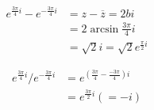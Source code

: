 \documentclass[11pt, a4paper, norsk]{NTNUoving}
\begin{document}
\begin{oppgave}
    \begin{punkt}
        \begin{align*}
            e^{\frac{3\pi}{4}i} - e^{-\frac{3\pi}{4}i} &=
            z-\overline{z} = 2bi
            \\&= 2\arcsin{\frac{3\pi}{4}}i
            \\&= \sqrt{2}i = \sqrt{2} e^{\frac{\pi}{2}i}
        \end{align*}
    \end{punkt}
    
    \begin{punkt}
        \begin{align*}
            e^{\frac{3\pi}{4}i} / e^{-\frac{3\pi}{4}i} &=
            e^{(\frac{3\pi}{4}- \frac{-3\pi}{4})i}
            \\&= e^{\frac{3\pi}{2}i} (=-i)
        \end{align*}
    \end{punkt}
\end{oppgave}
\end{document}
